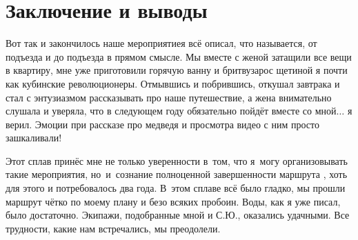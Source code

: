 \chapter{Заключение и выводы} 
\vepsianrose

Вот так и закончилось наше мероприятие\mdash я всё описал, что называется, от подъезда и до подъезда в прямом смысле. Мы вместе с женой затащили все вещи в квартиру, мне уже приготовили горячую ванну и бритву\mdash зарос щетиной я почти как кубинские революционеры. Отмывшись и побрившись, откушал завтрака и стал с энтузиазмом рассказывать про наше путешествие, а жена внимательно слушала и уверяла, что в следующем году обязательно пойдёт вместе со мной$\ldots$ я верил. Эмоции при рассказе про медведя и просмотра видео с ним просто зашкаливали!

Этот сплав принёс мне не только уверенности в~том, что я~могу организовывать такие мероприятия, но~и~сознание полноценной завершенности маршрута , хоть для этого и потребовалось два года. В~этом сплаве всё было гладко, мы прошли маршрут чётко по моему плану и безо всяких пробоин. Воды, как я уже писал, было достаточно. Экипажи, подобранные мной и С.Ю., оказались удачными. Все трудности, какие нам встречались, мы преодолели.

